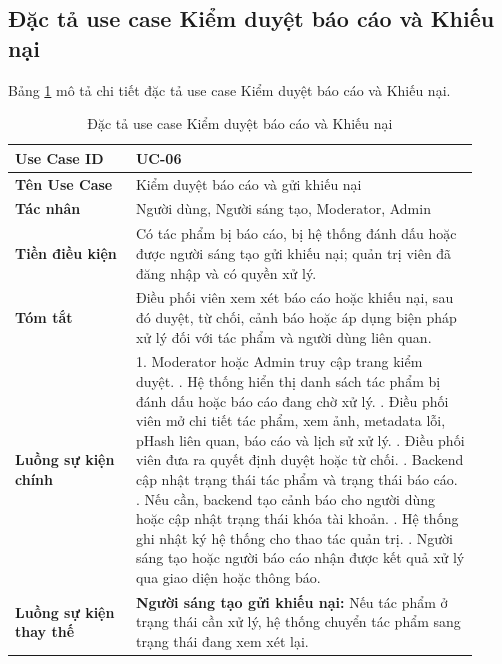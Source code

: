 \subsection{Đặc tả use case Kiểm duyệt báo cáo và Khiếu nại}
\label{subsection:2.3.6}

Bảng \ref{table:2_7} mô tả chi tiết đặc tả use case Kiểm duyệt báo cáo và Khiếu nại.
\begin{table}[h!]
    \caption{Đặc tả use case Kiểm duyệt báo cáo và Khiếu nại}
    \label{table:2_7}
\centering
\small
\renewcommand{\arraystretch}{1.2}
\begin{tabular}{|p{0.24\linewidth}|p{0.68\linewidth}|}
\hline
\textbf{Use Case ID} & UC-06 \\
\hline
\textbf{Tên Use Case} & Kiểm duyệt báo cáo và gửi khiếu nại \\
\hline
\textbf{Tác nhân} & Người dùng, Người sáng tạo, Moderator, Admin \\
\hline
\textbf{Tiền điều kiện} & Có tác phẩm bị báo cáo, bị hệ thống đánh dấu hoặc được người sáng tạo gửi khiếu nại; quản trị viên đã đăng nhập và có quyền xử lý. \\
\hline
\textbf{Tóm tắt} & Điều phối viên xem xét báo cáo hoặc khiếu nại, sau đó duyệt, từ chối, cảnh báo hoặc áp dụng biện pháp xử lý đối với tác phẩm và người dùng liên quan. \\
\hline
\textbf{Luồng sự kiện chính} &
1. Moderator hoặc Admin truy cập trang kiểm duyệt. \newline
2. Hệ thống hiển thị danh sách tác phẩm bị đánh dấu hoặc báo cáo đang chờ xử lý. \newline
3. Điều phối viên mở chi tiết tác phẩm, xem ảnh, metadata lỗi, pHash liên quan, báo cáo và lịch sử xử lý. \newline
4. Điều phối viên đưa ra quyết định duyệt hoặc từ chối. \newline
5. Backend cập nhật trạng thái tác phẩm và trạng thái báo cáo. \newline
6. Nếu cần, backend tạo cảnh báo cho người dùng hoặc cập nhật trạng thái khóa tài khoản. \newline
7. Hệ thống ghi nhật ký hệ thống cho thao tác quản trị. \newline
8. Người sáng tạo hoặc người báo cáo nhận được kết quả xử lý qua giao diện hoặc thông báo. \\
\hline
\textbf{Luồng sự kiện thay thế} &
\textbf{Người sáng tạo gửi khiếu nại:} Nếu tác phẩm ở trạng thái cần xử lý, hệ thống chuyển tác phẩm sang trạng thái đang xem xét lại. \newline

\end{tabular}
\end{table}
